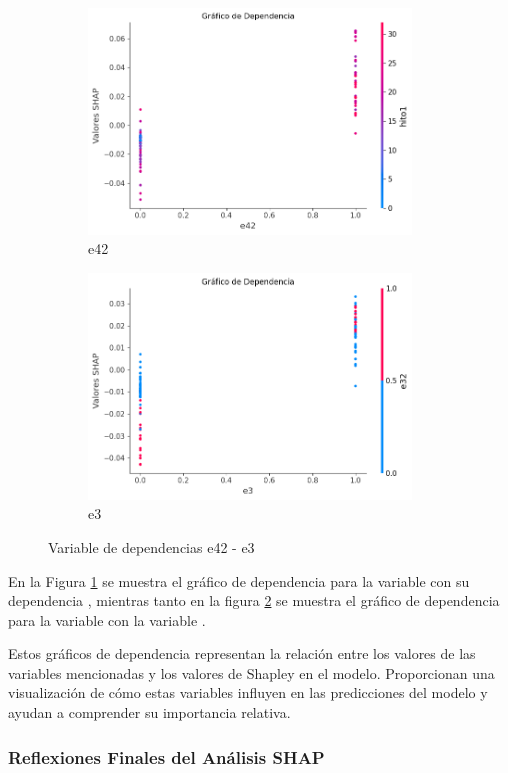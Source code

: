 \begin{figure}[ht]
    \begin{subfigure}{0.48\textwidth}
        \includegraphics[width=0.9\linewidth, height=6cm]{img/shap_rf/e42.png}
        \caption{e42}
        \label{fig:dependencia_e42}
    \end{subfigure}
    \begin{subfigure}{0.5\textwidth}
        \includegraphics[width=0.9\linewidth, height=6cm]{img/shap_rf/e3.png}
        \caption{e3}
        \label{fig:dependencia_e3}
    \end{subfigure}
    \caption{Variable de dependencias e42 - e3}
    \label{fig:image3}
\end{figure}

En la Figura \ref{fig:dependencia_e42} se muestra el gráfico de dependencia para la variable  con su dependencia , mientras tanto en la figura \ref{fig:dependencia_e3} se muestra el gráfico de dependencia para la variable  con la variable .

Estos gráficos de dependencia representan la relación entre los valores de las variables mencionadas y los valores de Shapley en el modelo. Proporcionan una visualización de cómo estas variables influyen en las predicciones del modelo y ayudan a comprender su importancia relativa.


\subsubsection{Reflexiones Finales del Análisis SHAP}

